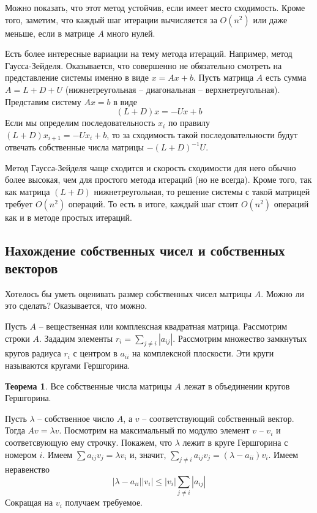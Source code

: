 \documentclass[10pt,a4paper,oneside]{book}
\theoremstyle{definition}
\newtheorem{thm}{\color{red!40!black}Теорема}
\renewcommand{\leq}{\leqslant}
\def\thrm{\begin{thm}}
\def\ethrm{\end{thm}}
\begin{document}
Можно показать, что этот метод устойчив, если имеет место сходимость. Кроме того, заметим, что каждый шаг итерации вычисляется за $O(n^2)$ или даже меньше, если в матрице $A$ много нулей.

Есть более интересные вариации на тему метода итераций. Например, метод Гаусса-Зейделя. Оказывается, что совершенно не обязательно смотреть на представление системы именно в виде $x=Ax+b$. Пусть матрица $A$ есть сумма $A=L+D+U$ (нижнетреугольная -- диагональная -- верхнетреугольная). Представим систему $Ax=b$ в виде 
$$(L+D)x=-Ux+b$$
Если мы определим последовательность $x_i$ по правилу $(L+D)x_{i+1}=-Ux_i+b$, то за сходимость такой последовательности будут отвечать собственные числа матрицы $-(L+D)^{-1}U$. 

Метод Гаусса-Зейделя чаще сходится и скорость сходимости для него обычно более высокая, чем для простого метода итераций (но не всегда). Кроме того, так как матрица $(L+D)$ нижнетреугольная, то решение системы с такой матрицей требует $O(n^2)$ операций. То есть в итоге, каждый шаг стоит $O(n^2)$ операций как и в методе простых итераций.







\subsection{Нахождение собственных чисел и собственных векторов}

Хотелось бы уметь оценивать размер собственных чисел матрицы $A$. Можно ли это сделать? Оказывается, что можно. 


Пусть $A$ -- вещественная или комплексная квадратная матрица. Рассмотрим строки $A$. Зададим элементы $r_i=\sum_{j\neq i} |a_{ij}|$. Рассмотрим множество замкнутых кругов радиуса $r_i$ с центром в $a_{ii}$ на комплексной плоскости. Эти круги называются кругами Гершгорина. 

\thrm Все собственные числа матрицы $A$ лежат в объединении кругов Гершгорина. 
\ethrm
\proof Пусть $\lambda$ -- собственное число $A$, а $v$ -- соответствующий собственный вектор. Тогда $Av=\lambda v$. Посмотрим на максимальный по модулю элемент $v$ -- $v_i$ и соответсвующую ему строчку. Покажем, что $\lambda$ лежит в круге Гершгорина с номером $i$. Имеем $\sum a_{ij}v_j =\lambda v_i$  и, значит, $\sum_{j\neq i} a_{ij}v_j= (\lambda - a_{ii})v_i $. Имеем неравенство $$|\lambda -a_{ii}||v_i| \leq |v_i|\sum_{j\neq i} |a_{ij}|$$
Сокращая на $v_i$ получаем требуемое. 
\endproof
\end{document}
